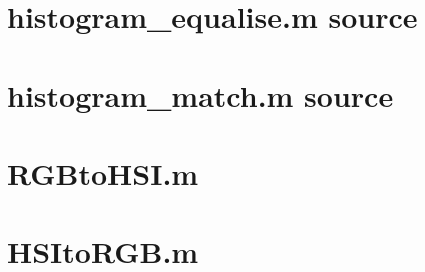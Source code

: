 \documentclass[a4paper]{article}
\begin{document}
\section{histogram\_equalise.m source} 
\label{appendix-hist-eq} 


\section{histogram\_match.m source} 
\label{appendix-hist-match} 


\section{RGBtoHSI.m}
\label{appendix-rgbhsi}


\section{HSItoRGB.m}
\label{appendix-hsirgb}

\end{document}
